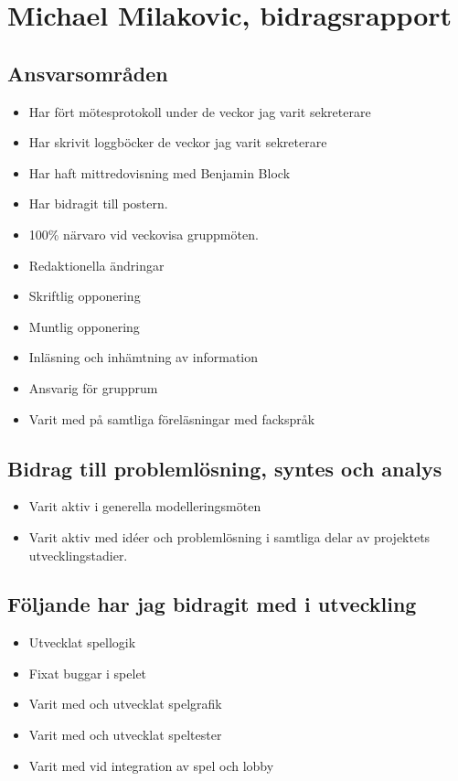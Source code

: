 \section{Michael Milakovic, bidragsrapport}
\subsection{Ansvarsområden}
\begin{itemize}
    \item Har fört mötesprotokoll under de veckor jag varit sekreterare
    \item Har skrivit loggböcker de veckor jag varit sekreterare
    \item Har haft mittredovisning med Benjamin Block
    \item Har bidragit till postern.
    \item 100\% närvaro vid veckovisa gruppmöten. 
    \item Redaktionella ändringar
    \item Skriftlig opponering
    \item Muntlig opponering
    \item Inläsning och inhämtning av information
    \item Ansvarig för grupprum
    \item Varit med på samtliga föreläsningar med fackspråk
\end{itemize}

\subsection{Bidrag till problemlösning, syntes och analys}
\begin{itemize}
    \item Varit aktiv i generella modelleringsmöten
    \item Varit aktiv med idéer och problemlösning i samtliga delar av projektets utvecklingstadier. 
\end{itemize}


\subsection{Följande har jag bidragit med i utveckling}
\begin{itemize}
  \item Utvecklat spellogik
  \item Fixat buggar i spelet
  \item Varit med och utvecklat spelgrafik
  \item Varit med och utvecklat speltester
  \item Varit med vid integration av spel och lobby
\end{itemize}

